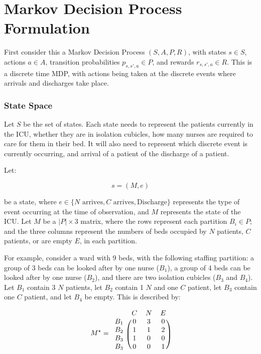 \documentclass{article}
\begin{document}
\section{Markov Decision Process Formulation}
First consider this a Markov Decision Process $(S, A, P, R)$, with states $s \in S$, actions $a \in A$, transition probabilities $p_{s,s',a} \in P$, and rewards $r_{s,s',a} \in R$.
This is a discrete time MDP, with actions being taken at the discrete events where arrivals and discharges take place.

\subsubsection*{State Space}
Let $S$ be the set of states.
Each state needs to represent the patients currently in the ICU, whether they are in isolation cubicles, how many nurses are required to care for them in their bed.
It will also need to represent which discrete event is currently occurring, and arrival of a patient of the discharge of a patient.

Let:

\begin{equation*}
s = (M, e)
\end{equation*}

be a state, where $e \in \{N \text{ arrives}, C \text{ arrives}, \text{Discharge}\}$ represents the type of event occurring at the time of observation, and $M$ represents the state of the ICU. Let $M$ be a $|P| \times 3$ matrix, where the rows represent each partition $B_i \in P$; and the three columns represent the numbers of beds occupied by $N$ patients, $C$ patients, or are empty $E$, in each partition.

For example, consider a ward with 9 beds, with the following staffing partition:
a group of 3 beds can be looked after by one nurse ($B_1$), a group of 4 beds can be looked after by one nurse ($B_2$), and there are two isolation cubicles ($B_3$ and $B_4$).
Let $B_1$ contain 3 $N$ patients, let $B_2$ contain 1 $N$ and one $C$ patient, let $B_3$ contain one $C$ patient, and let $B_4$ be empty.
This is described by:

\begin{equation*}
M^{\star} =
\begin{blockarray}{cccc}
& C & N & E \\
\begin{block}{c(ccc)}
B_1 & 0 & 3 & 0 \\
B_2 & 1 & 1 & 2 \\
B_3 & 1 & 0 & 0 \\
B_3 & 0 & 0 & 1 \\
\end{block}
\end{blockarray}
\end{equation*}
\end{document}
